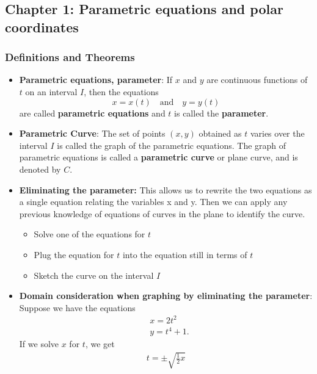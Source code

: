\documentclass{report}
\begin{document}
    \pagebreak 

    \bigbreak \noindent 
    \subsection{Chapter 1: Parametric equations and polar coordinates}
    \subsubsection{Definitions and Theorems} 
    \begin{itemize}
        \item \textbf{Parametric equations, parameter}: 
            If \( x \) and \( y \) are continuous functions of \( t \) on an interval \( I \), then the equations
            \[ x = x(t) \quad \text{and} \quad y = y(t) \]
            are called \textbf{parametric equations} and \( t \) is called the \textbf{parameter}. 
        \item \textbf{Parametric Curve}: The set of points \( (x, y) \) obtained as \( t \) varies over the interval \( I \) is called the graph of the parametric equations. The graph of parametric equations is called a \textbf{parametric curve} or plane curve, and is denoted by \( C \).
        \item \textbf{Eliminating the parameter:} This allows us to rewrite the two equations as a single equation relating the variables x and y. Then we can apply any previous knowledge of equations of curves in the plane to identify the curve. 
            \begin{itemize}
                \item Solve one of the equations for $t$
                \item Plug the equation for $t$ into the equation still in terms of $t$
                \item Sketch the curve on the interval $I$
            \end{itemize}
        \item \textbf{Domain consideration when graphing by eliminating the parameter}: Suppose we have the equations 
            \begin{align*}
                &x = 2t^{2} \\
                &y = t^{4} + 1
            .\end{align*}
            If we solve $x$ for $t$, we get 
            \begin{align*}
                 t = \pm \sqrt{\frac{1}{2}x}

\end{align*}
\end{itemize}
\end{document}
